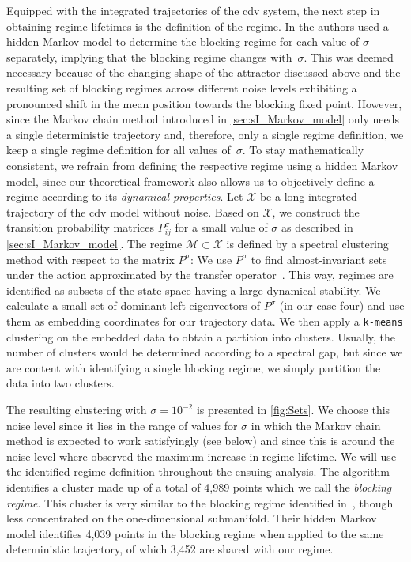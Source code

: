 Equipped with the integrated trajectories of the \gls{cdv} system, the next step in obtaining regime lifetimes is the definition of the regime. In \textcite{dorringtonInteractionStochasticForcing2023} the authors used a hidden Markov model to determine the blocking regime for each value of $\sigma$ separately, implying that the blocking regime changes with~$\sigma$. This was deemed necessary because of the changing shape of the attractor discussed above and the resulting set of blocking regimes across different noise levels exhibiting a pronounced shift in the mean position towards the blocking fixed point. However, since the Markov chain method introduced in \cref{sec:sI_Markov_model} only needs a single deterministic trajectory and, therefore, only a single regime definition, we keep a single regime definition for all values of~$\sigma$.
To stay mathematically consistent, we refrain from defining the respective regime using a hidden Markov model, since our theoretical framework also allows us to objectively define a regime according to its \emph{dynamical properties}. Let $\mathcal{X}$ be a long integrated trajectory of the \gls{cdv} model without noise. Based on $\mathcal{X}$, we construct the transition probability matrices $P_{ij}^{\sigma}$ for a small value of $\sigma$ as described in \cref{sec:sI_Markov_model}. The regime $\mathcal{M} \subset \mathcal{X}$ is defined by a spectral clustering method with respect to the matrix $P^\sigma$: We use $P^\sigma$ to find almost-invariant sets under the action approximated by the transfer operator~\parencite{dellnitzApproximationComplicatedDynamical1999}. This way, regimes are identified as subsets of the state space having a large dynamical stability. We calculate a small set of dominant left-eigenvectors of $P^{\sigma}$ (in our case four) and use them as embedding coordinates for our trajectory data. We then apply a \texttt{k-means} clustering on the embedded data to obtain a partition into clusters. Usually, the number of clusters would be determined according to a spectral gap, but since we are content with identifying a single blocking regime, we simply partition the data into two clusters.

The resulting clustering with $\sigma=10^{-2}$ is presented in \cref{fig:Sets}. We choose this noise level since it lies in the range of values for $\sigma$ in which the Markov chain method is expected to work satisfyingly (see below) and since this is around the noise level where \textcite{dorringtonInteractionStochasticForcing2023} observed the maximum increase in regime lifetime. We will use the identified regime definition throughout the ensuing analysis. The algorithm identifies a cluster made up of a total of 4,989 points which we call the \emph{blocking regime}. This cluster is very similar to the blocking regime identified in~\textcite{dorringtonInteractionStochasticForcing2023}, though less concentrated on the one-dimensional submanifold. Their hidden Markov model identifies 4,039 points in the blocking regime when applied to the same deterministic trajectory, of which 3,452 are shared with our regime.


